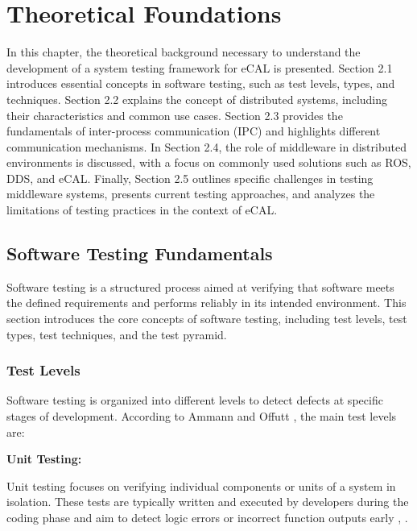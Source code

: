 \clearpage
\section{Theoretical Foundations}

In this chapter, the theoretical background necessary to understand the development of a system testing framework for eCAL is presented. Section 2.1 introduces essential concepts in software testing, such as test levels, types, and techniques. Section 2.2 explains the concept of distributed systems, including their characteristics and common use cases. Section 2.3 provides the fundamentals of inter-process communication (IPC) and highlights different communication mechanisms. In Section 2.4, the role of middleware in distributed environments is discussed, with a focus on commonly used solutions such as ROS, DDS, and eCAL. Finally, Section 2.5 outlines specific challenges in testing middleware systems, presents current testing approaches, and analyzes the limitations of testing practices in the context of eCAL.

\subsection{Software Testing Fundamentals}

Software testing is a structured process aimed at verifying that software meets the defined requirements and performs reliably in its intended environment. This section introduces the core concepts of software testing, including test levels, test types, test techniques, and the test pyramid.

\subsubsection{Test Levels}

Software testing is organized into different levels to detect defects at specific stages of development. According to Ammann and Offutt \cite{ammann2016introduction}, the main test levels are:

\vspace{1em}
\textbf{Unit Testing:}

\vspace{0.4em}
Unit testing focuses on verifying individual components or units of a system in isolation. These tests are typically written and executed by developers during the coding phase and aim to detect logic errors or incorrect function outputs early \cite{pressman2014software}, \cite{spillner2019softwaretest}.

